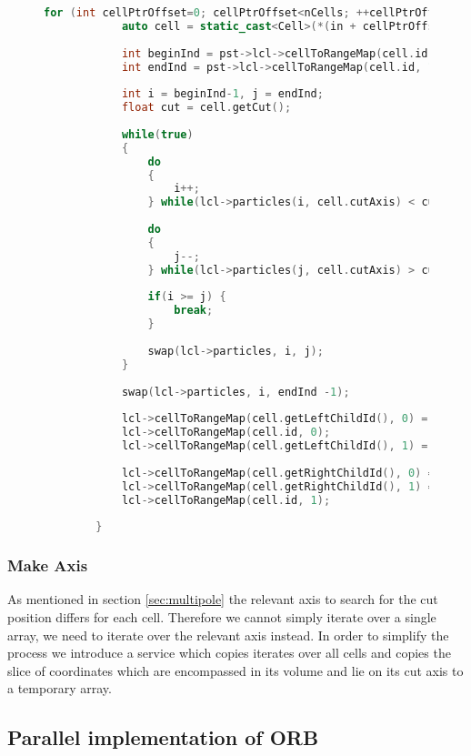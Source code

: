 \documentclass[]{article}
\begin{document}
\begin{figure}[H]
	\begin{lstlisting}[language=c++]
		for (int cellPtrOffset=0; cellPtrOffset<nCells; ++cellPtrOffset){
			auto cell = static_cast<Cell>(*(in + cellPtrOffset));
			
			int beginInd = pst->lcl->cellToRangeMap(cell.id, 0);
			int endInd = pst->lcl->cellToRangeMap(cell.id, 1);
			
			int i = beginInd-1, j = endInd;
			float cut = cell.getCut();
			
			while(true)
			{
				do
				{
					i++;
				} while(lcl->particles(i, cell.cutAxis) < cut && i <= endInd);
				
				do
				{
					j--;
				} while(lcl->particles(j, cell.cutAxis) > cut && j >= beginInd);
				
				if(i >= j) {
					break;
				}
				
				swap(lcl->particles, i, j);
			}
			
			swap(lcl->particles, i, endInd -1);
			
			lcl->cellToRangeMap(cell.getLeftChildId(), 0) =
			lcl->cellToRangeMap(cell.id, 0);
			lcl->cellToRangeMap(cell.getLeftChildId(), 1) = i;
			
			lcl->cellToRangeMap(cell.getRightChildId(), 0) = i;
			lcl->cellToRangeMap(cell.getRightChildId(), 1) =
			lcl->cellToRangeMap(cell.id, 1);
			
		}
	\end{lstlisting}
\end{figure}


\subsubsection{Make Axis}

As mentioned in section \ref{sec:multipole} the relevant axis to search for the cut position differs for each cell. Therefore we cannot simply iterate over a single array, we need to iterate over the relevant axis instead. In order to simplify the process we introduce a service which copies iterates over all cells and copies the slice of coordinates which are encompassed in its volume and lie on its cut axis to a temporary array.



\subsection{Parallel implementation of ORB }\label{sec:parellize-orb}
\end{document}
